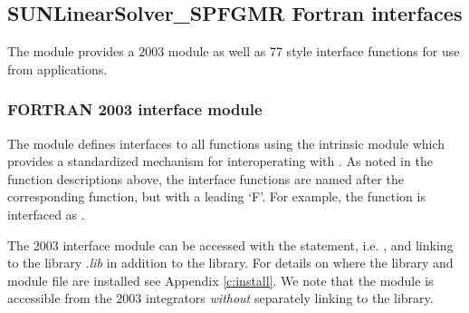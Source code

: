 \subsection{SUNLinearSolver\_SPFGMR Fortran interfaces}
\label{ss:sunlinsol_spfgmr_fortran}

The {\sunlinsolspfgmr} module provides a {\F} 2003 module as well as {\F} 77
style interface functions for use from {\F} applications.

\subsubsection*{FORTRAN 2003 interface module}
The  {\F} module defines interfaces to all
{\sunlinsolspfgmr} {\CC} functions using the intrinsic 
module which provides a standardized mechanism for interoperating with {\CC}. As
noted in the {\CC} function descriptions above, the interface functions are
named after the corresponding {\CC} function, but with a leading `F'. For
example, the function  is interfaced as
.

The {\F} 2003 {\sunlinsolspfgmr} interface module can be accessed with the 
statement, i.e. , and linking to the library
.{\em lib} in addition to the {\CC} library.
For details on where the library and module file
 are installed see Appendix \ref{c:install}.
We note that the module is accessible from the {\F} 2003 {\sundials} integrators
\textit{without} separately linking to the
 library.

